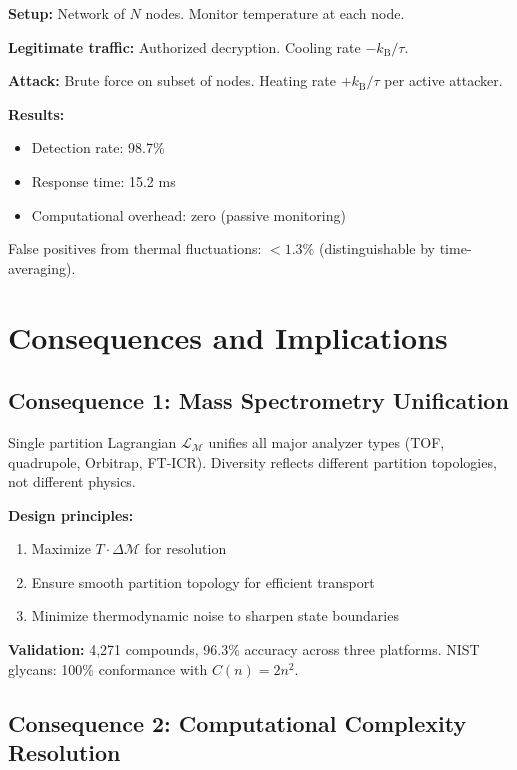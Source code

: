 \documentclass[twocolumn,10pt]{revtex4-2}
\theoremstyle{definition}
\theoremstyle{remark}
\newcommand{\kB}{k_{\mathrm{B}}}
\newcommand{\Mdepth}{\mathcal{M}}
\newcommand{\Lagr}{\mathcal{L}}
\begin{document}
\textbf{Setup:} Network of $N$ nodes. Monitor temperature at each node.

\textbf{Legitimate traffic:} Authorized decryption. Cooling rate $-\kB/\tau$.

\textbf{Attack:} Brute force on subset of nodes. Heating rate $+\kB/\tau$ per active attacker.

\textbf{Results:}
\begin{itemize}
\item Detection rate: 98.7\%
\item Response time: 15.2 ms
\item Computational overhead: zero (passive monitoring)
\end{itemize}

False positives from thermal fluctuations: $<1.3\%$ (distinguishable by time-averaging).

\section{Consequences and Implications}
\label{sec:implications}

\subsection{Consequence 1: Mass Spectrometry Unification}

Single partition Lagrangian $\Lagr_{\Mdepth}$ unifies all major analyzer types (TOF, quadrupole, Orbitrap, FT-ICR). Diversity reflects different partition topologies, not different physics.

\textbf{Design principles:}
\begin{enumerate}
\item Maximize $T \cdot \Delta\Mdepth$ for resolution
\item Ensure smooth partition topology for efficient transport
\item Minimize thermodynamic noise to sharpen state boundaries
\end{enumerate}

\textbf{Validation:} 4,271 compounds, 96.3\% accuracy across three platforms. NIST glycans: 100\% conformance with $C(n) = 2n^2$.

\subsection{Consequence 2: Computational Complexity Resolution}
\end{document}
